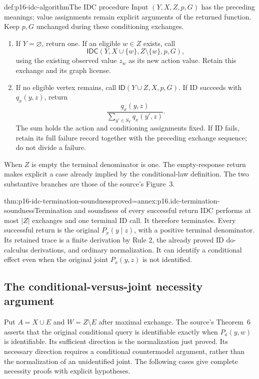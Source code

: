\begin{hbmethod}{def:p16-idc-algorithm}{The IDC procedure}
Input \((Y,X,Z,p,G)\) has the preceding meanings; value assignments
remain explicit arguments of the returned function. Keep \(p,G\)
unchanged during these conditioning exchanges.
\begin{enumerate}
\item If \(Y=\varnothing\), return one. If an eligible
      \(w\in Z\) exists, call
      \[
       \mathsf{IDC}(Y,X\cup\{w\},Z\setminus\{w\},p,G),
      \]
      using the existing observed value \(z_w\) as its new
      action value. Retain this exchange and its graph license.
\item If no eligible vertex remains, call
      \(\mathsf{ID}(Y\cup Z,X,p,G)\). If ID succeeds with
      \(q_x(y,z)\), return
      \[
       \frac{q_x(y,z)}{\sum_{y'\in S_Y}q_x(y',z)}.
      \]
      The sum holds the action and conditioning assignments fixed.
      If ID fails, retain its full failure record together with
      the preceding exchange sequence; do not divide a failure.
\end{enumerate}
When \(Z\) is empty the terminal denominator is one. The
empty-response return makes explicit a case already implied by the
conditional-law definition. The two substantive branches are those
of the source's Figure~3.
\end{hbmethod}

\begin{hbtheorem}{thm:p16-idc-termination-soundness}{proved=annex:p16.idc-termination-soundness}{Termination and soundness of every successful return}
IDC performs at most \(|Z|\) exchanges and one terminal ID call.
It therefore terminates. Every successful return is the original
\(P_x(y\mid z)\), with a positive terminal denominator.
Its retained trace is a finite derivation by Rule 2, the already
proved ID do-calculus derivations, and ordinary normalization.
It can identify a conditional effect even when the original joint
\(P_x(y,z)\) is not identified.
\end{hbtheorem}

\subsection{The conditional-versus-joint necessity argument}

Put \(A=X\cup E\) and \(W=Z\setminus E\) after maximal
exchange. The source's Theorem~6 asserts that the original conditional
query is identifiable exactly when \(P_a(y,w)\) is identifiable.
Its sufficient direction is the normalization just proved. Its necessary
direction requires a conditional countermodel argument, rather than the
normalization of an unidentified joint. The following cases give complete
necessity proofs with explicit hypotheses.

